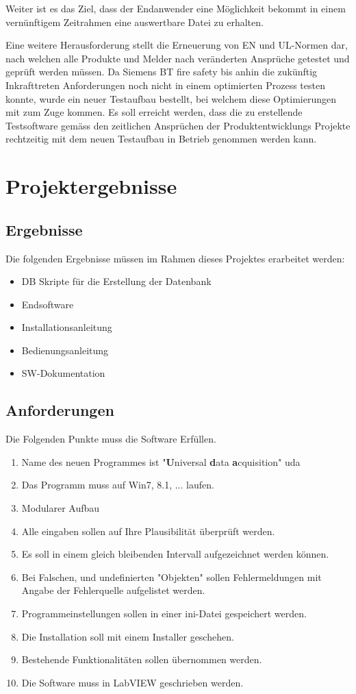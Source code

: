 \documentclass[10pt]{scrartcl}
\begin{document}
Weiter ist es das Ziel, dass der Endanwender eine Möglichkeit bekommt in einem vernünftigem Zeitrahmen eine auswertbare Datei zu erhalten.

Eine weitere Herausforderung stellt die Erneuerung von EN und UL-Normen dar, nach welchen alle Produkte und Melder nach veränderten Ansprüche getestet und geprüft werden müssen. Da Siemens BT fire safety bis anhin die zukünftig Inkrafttreten Anforderungen noch nicht in einem optimierten Prozess testen konnte, wurde ein neuer Testaufbau bestellt, bei welchem diese Optimierungen mit zum Zuge kommen. Es soll erreicht werden, dass die zu erstellende Testsoftware gemäss den zeitlichen Ansprüchen der Produktentwicklungs Projekte rechtzeitig mit dem neuen Testaufbau in Betrieb genommen werden kann.
\section{Projektergebnisse}
\subsection{Ergebnisse}
Die folgenden Ergebnisse müssen im Rahmen dieses Projektes erarbeitet werden:
\begin{itemize}
	\item DB Skripte für die Erstellung der Datenbank
	\item Endsoftware
	\item Installationsanleitung
	\item Bedienungsanleitung
	\item SW-Dokumentation
\end{itemize}
\subsection{Anforderungen}
Die Folgenden Punkte muss die Software Erfüllen.
\begin{enumerate}
	\item Name des neuen Programmes ist "\textbf{U}niversal \textbf{d}ata \textbf{a}cquisition" \acrshort{uda}
	\item Das Programm muss auf Win7, 8.1, ... laufen.
	\item Modularer Aufbau
	\item Alle eingaben sollen auf Ihre Plausibilität überprüft werden.
	\item Es soll in einem gleich bleibenden Intervall aufgezeichnet werden können.
	\item Bei Falschen, und undefinierten "Objekten" sollen Fehlermeldungen mit Angabe der Fehlerquelle aufgelistet werden.
	\item Programmeinstellungen sollen in einer ini-Datei gespeichert werden.
	\item Die Installation soll mit einem Installer geschehen.
	\item Bestehende Funktionalitäten sollen übernommen werden.
	\item Die Software muss in \gls{LabVIEW} geschrieben werden.
\end{enumerate}
\end{document}
